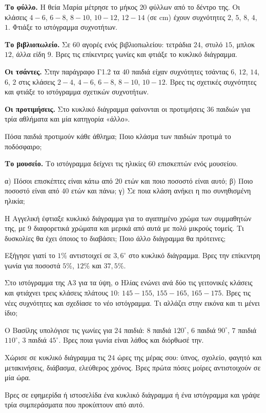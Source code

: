 
\ex \textbf{Το φύλλο.} Η θεία Μαρία μέτρησε το μήκος $20$ φύλλων από το δέντρο της. Οι κλάσεις $4-6$, $6-8$, $8-10$, $10-12$, $12-14$ (σε cm) έχουν συχνότητες $2$, $5$, $8$, $4$, $1$. Φτιάξε το ιστόγραμμα συχνοτήτων.

\ex \textbf{Το βιβλιοπωλείο.} Σε $60$ αγορές ενός βιβλιοπωλείου: τετράδια $24$, στυλό $15$, μπλοκ $12$, άλλα είδη $9$. Βρες τις επίκεντρες γωνίες και φτιάξε το κυκλικό διάγραμμα.

\ex \textbf{Οι τσάντες.} Στην παράγραφο Γ1.2 τα $40$ παιδιά είχαν συχνότητες τσάντας $6$, $12$, $14$, $6$, $2$ στις κλάσεις $2-4$, $4-6$, $6-8$, $8-10$, $10-12$. Βρες τις σχετικές συχνότητες και φτιάξε το ιστόγραμμα σχετικών συχνοτήτων.

\ex \textbf{Οι προτιμήσεις.} Στο κυκλικό διάγραμμα φαίνονται οι προτιμήσεις $36$ παιδιών για τρία αθλήματα και μία κατηγορία «άλλο».
\begin{center}
\end{center}
Πόσα παιδιά προτιμούν κάθε άθλημα; Ποιο κλάσμα των παιδιών προτιμά το ποδόσφαιρο;

\ex \textbf{Το μουσείο.} Το ιστόγραμμα δείχνει τις ηλικίες $60$ επισκεπτών ενός μουσείου.
\begin{center}
\end{center}
α) Πόσοι επισκέπτες είναι κάτω από $20$ ετών και ποιο ποσοστό είναι αυτό; β) Ποιο ποσοστό είναι από $40$ ετών και πάνω; γ) Σε ποια κλάση ανήκει η πιο συνηθισμένη ηλικία;


\ex Η Αγγελική έφτιαξε κυκλικό διάγραμμα για το αγαπημένο χρώμα των συμμαθητών της, με $9$ διαφορετικά χρώματα και μερικά από αυτά με πολύ μικρούς τομείς. Τι δυσκολίες θα έχει όποιος το διαβάσει; Ποιο άλλο διάγραμμα θα πρότεινες;

\ex Εξήγησε γιατί το $1\%$ αντιστοιχεί σε $3{,}6^\circ$ στο κυκλικό διάγραμμα. Βρες την επίκεντρη γωνία για ποσοστά $5\%$, $12\%$ και $37{,}5\%$.

\ex Στο ιστόγραμμα της Α$3$ για τα ύψη, ο Ηλίας ενώνει ανά δύο τις γειτονικές κλάσεις και φτιάχνει τρεις κλάσεις πλάτους $10$: $145-155$, $155-165$, $165-175$. Βρες τις νέες συχνότητες και σχεδίασε το νέο ιστόγραμμα. Τι αλλάζει στην εικόνα και τι μένει ίδιο;

\ex Ο Βασίλης υπολόγισε τις γωνίες για $24$ παιδιά: $8$ παιδιά $120^\circ$, $6$ παιδιά $90^\circ$, $7$ παιδιά $110^\circ$, $3$ παιδιά $45^\circ$. Βρες ποια γωνία είναι λάθος και διόρθωσέ την.


\ex Χώρισε σε κυκλικό διάγραμμα τις $24$ ώρες της μέρας σου: ύπνος, σχολείο, φαγητό και μετακινήσεις, διάβασμα, ελεύθερος χρόνος. Βρες πρώτα πόσες μοίρες αντιστοιχούν σε μία ώρα.

\ex Βρες σε εφημερίδα ή ιστοσελίδα ένα κυκλικό διάγραμμα ή ένα ιστόγραμμα και γράψε τρία συμπεράσματα που προκύπτουν από αυτό.
